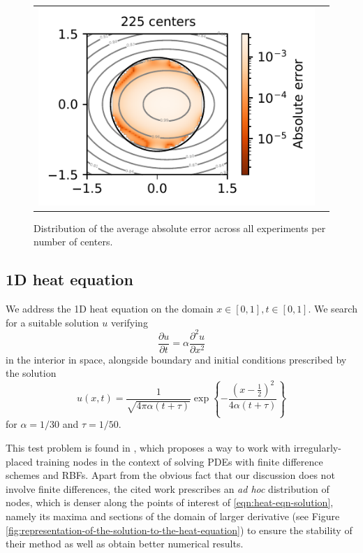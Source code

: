\documentclass[12pt]{report} %
\newcommand{\tmem}[1]{{\em #1\/}}
\begin{document}
\begin{figure}
\begin{tabular}{ccl}
    \multicolumn{2}{l}{\includegraphics[width=.4\textwidth, clip=true,trim={0 0 2.1cm 0}]{imagenes/experiments/2d/pde_runge_2d/runge_2d_225.pdf}} &
  \end{tabular}
  \caption{Distribution of the average absolute error across all experiments per number of centers.}
  \label{fig:runge-pde-2d-results-errors-avg}
\end{figure}

\clearpage
\subsection{1D heat equation}

We address the 1D heat equation on the domain $x \in [0, 1], t \in [0, 1]$. We search for a suitable solution $u$ verifying
\[ \frac{\partial u}{\partial t} = \alpha \frac{\partial^2 u}{\partial x^2} \]
in the interior in space, alongside boundary and initial conditions prescribed by the 
solution
\begin{equation}
  u (x, t) = \frac{1}{\sqrt{4 \pi \alpha (t + \tau)}} \exp \left\{ -
  \frac{\left( x - \frac{1}{2} \right)^2}{4 \alpha (t + \tau)} \right\}
  \label{eqn:heat-eqn-solution}
\end{equation}
for $\alpha = 1 / 30$ and $\tau = 1 / 50$. 

This test problem is found in \cite{abrahamsen2019explicit}, which proposes a way to work with irregularly-placed training
nodes in the context of solving PDEs with finite difference schemes and RBFs.
Apart from the obvious fact that our discussion does not involve finite differences,
the cited work prescribes an {\tmem{ad hoc}} distribution of nodes, which is
denser along the points of interest of \eqref{eqn:heat-eqn-solution}, namely
its maxima and sections of the domain of larger derivative (see Figure \ref{fig:representation-of-the-solution-to-the-heat-equation}) to ensure the stability of their method as well as obtain better numerical results.
\end{document}
